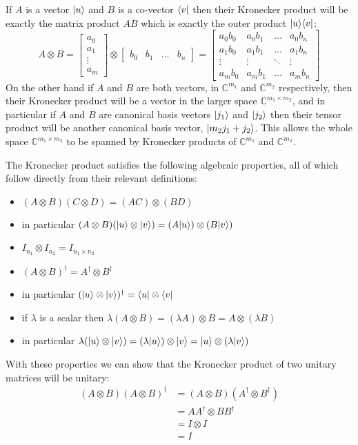If $A$ is a vector $| u \rangle$ and $B$ is a co-vector $\langle v |$ then their Kronecker product will be exactly the matrix product $AB$ which is exactly the outer product $| u \rangle\langle v |$:
\[
A \otimes B =
\left[\begin{matrix}
	a_0\\a_1\\\vdots\\a_m
\end{matrix}\right]
\otimes
\left[\begin{matrix}
	b_0&b_1&\dots&b_n
\end{matrix}\right]
=
\left[\begin{matrix}
	a_0b_0 & a_0b_1 & \dots & a_0b_n\\
	a_1b_0 & a_1b_1 & \dots & a_1b_n\\
	\vdots & \vdots & \ddots & \vdots\\
	a_mb_0 & a_mb_1 & \dots & a_mb_n
\end{matrix}\right]
\]
On the other hand if $A$ and $B$ are both vectors, in $\mathbb{C}^{m_1}$ and $\mathbb{C}^{m_2}$ respectively, then their Kronecker product will be a vector in the larger space $\mathbb{C}^{m_1\times m_2}$, and in particular if $A$ and $B$ are canonical basis vectors $| j_1 \rangle$ and $| j_2 \rangle$ then their tensor product will be another canonical basis vector, $| m_2j_1 + j_2 \rangle$. This allows the whole space $\mathbb{C}^{m_1 \times m_2}$ to be spanned by Kronecker products of $\mathbb{C}^{m_1}$ and $\mathbb{C}^{m_2}$.

The Kronecker product satisfies the following algebraic properties, all of which follow directly from their relevant definitions:
\begin{itemize}
	\item $(A\otimes B)(C \otimes D) = (AC) \otimes (BD)$
	\item in particular $(A\otimes B)(| u \rangle \otimes | v \rangle) = (A| u \rangle)\otimes (B| v \rangle)$
	\item $I_{n_1} \otimes I_{n_2} = I_{n_1\times n_2}$
	\item $(A\otimes B)^\dagger = A^\dagger \otimes B^\dagger$
	\item in particular $(| u \rangle\otimes | v \rangle)^\dagger = \langle u | \otimes \langle v |$
	\item if $\lambda$ is a scalar then $\lambda (A \otimes B) = (\lambda A) \otimes B = A \otimes (\lambda B)$
	\item in particular $\lambda (| u \rangle \otimes | v \rangle) = (\lambda | u \rangle) \otimes | v \rangle = | u \rangle \otimes (\lambda | v \rangle)$
\end{itemize}
With these properties we can show that the Kronecker product of two unitary matrices will be unitary:
\begin{align*}
	(A \otimes B)(A \otimes B)^\dagger
	&= (A \otimes B)(A^\dagger \otimes B^\dagger)
	\\&= AA^\dagger \otimes BB^\dagger
	\\&= I \otimes I
	\\&= I
\end{align*}


